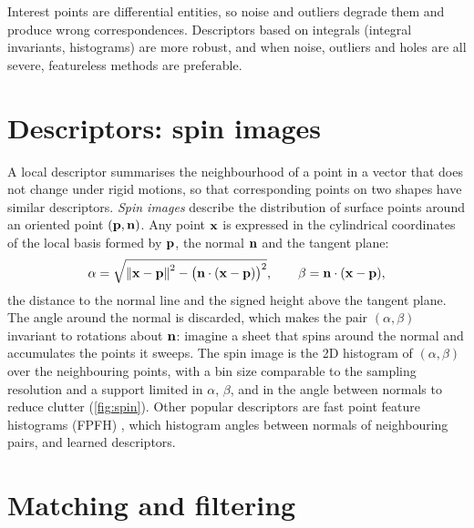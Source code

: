 Interest points are differential entities, so noise and outliers degrade them and produce wrong
correspondences. Descriptors based on integrals (integral invariants, histograms) are more robust,
and when noise, outliers and holes are all severe, featureless methods are preferable.

\section{Descriptors: spin images}

A local descriptor summarises the neighbourhood of a point in a vector that does not change under
rigid motions, so that corresponding points on two shapes have similar descriptors.
\emph{Spin images} \citep{Johnson1999} describe the distribution of surface points around an
oriented point $(\mathbf{p},\mathbf{n})$. Any point $\mathbf{x}$ is expressed in the cylindrical coordinates of the local
basis formed by $\mathbf{p}$, the normal $\mathbf{n}$ and the tangent plane:
\begin{equation}
\alpha=\sqrt{\left\lVert \mathbf{x}-\mathbf{p}\right\rVert^2-\bigl(\mathbf{n}\cdot(\mathbf{x}-\mathbf{p})\bigr)^2},\qquad \beta=\mathbf{n}\cdot(\mathbf{x}-\mathbf{p}),
\end{equation}
the distance to the normal line and the signed height above the tangent plane. The angle around the
normal is discarded, which makes the pair $(\alpha,\beta)$ invariant to rotations about $\mathbf{n}$:
imagine a sheet that spins around the normal and accumulates the points it sweeps. The spin image
is the 2D histogram of $(\alpha,\beta)$ over the neighbouring points, with a bin size comparable to
the sampling resolution and a support limited in $\alpha$, $\beta$, and in the angle between normals
to reduce clutter (\cref{fig:spin}). Other popular descriptors are fast point feature histograms
(FPFH) \citep{Rusu2009}, which histogram angles between normals of neighbouring pairs, and learned
descriptors.


\section{Matching and filtering}

